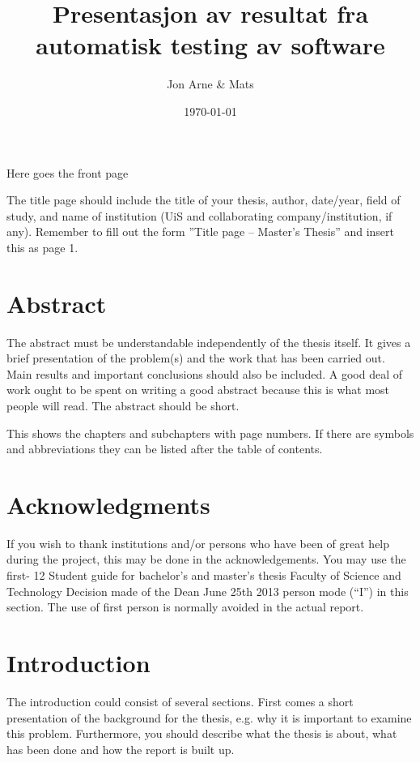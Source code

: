 \documentclass{article}
\author{Jon Arne \& Mats}
\title{Presentasjon av resultat fra automatisk testing av software}
\date{\today}
\begin{document}
	
\begin{center}
\begin{Huge}
Here goes the front page
\end{Huge} 
\end{center}

\pagebreak
\maketitle
The title page should include the title of your thesis, author, date/year, field of
study, and name of institution (UiS and collaborating company/institution, if any). Remember
to fill out the form ”Title page – Master’s Thesis” and insert this as page 1. 
\pagebreak

\section{Abstract}
The abstract must be understandable independently of the thesis itself. It gives a
brief presentation of the problem(s) and the work that has been carried out. Main results and
important conclusions should also be included. A good deal of work ought to be spent on
writing a good abstract because this is what most people will read. The abstract should be
short. 
\pagebreak

\tableofcontents 
This shows the chapters and subchapters with page numbers. If there are
symbols and abbreviations they can be listed after the table of contents. 
\pagebreak

\section{Acknowledgments}
If you wish to thank institutions and/or persons who have been of great
help during the project, this may be done in the acknowledgements. You may use the first-
12
Student guide for bachelor’s and master’s thesis
Faculty of Science and Technology
Decision made of the Dean June 25th 2013
person mode (“I”) in this section. The use of first person is normally avoided in the actual
report. 
\pagebreak

\section{Introduction}
The introduction could consist of several sections. First comes a short
presentation of the background for the thesis, e.g. why it is important to examine this
problem. Furthermore, you should describe what the thesis is about, what has been done and
how the report is built up. 
\end{document}
